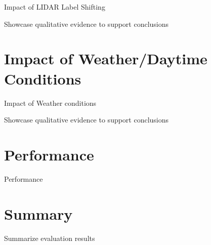 Impact of LIDAR Label Shifting

Showcase qualitative evidence to support conclusions

\newpage


\section{Impact of Weather/Daytime Conditions}
\label{sec:weather}

Impact of Weather conditions

Showcase qualitative evidence to support conclusions

\newpage


\section{Performance}
\label{sec:performance}

Performance


\section{Summary}
\label{sec:summary}

Summarize evaluation results

